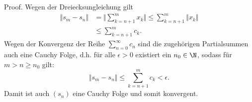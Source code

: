 \documentclass[letterpaper,10pt,english]{jupyterBook}
\begin{document}
\begin{emphBox}{}{}
Proof.  Wegen der Dreiecksungleichung gilt
\begin{align*}
\Vert s_m - s_n \Vert &= \Vert \sum_{k=n+1}^m x_k \Vert  \leq \sum_{k=n+1}^m  \Vert x_k \Vert \\
&\leq \sum_{k=n+1}^m c_k.\end{align*}
Wegen der Konvergenz der Reihe \(\sum_{n=0}^\infty c_n\) sind die zugehörigen Partialsummen auch eine Cauchy Folge, d.h. für alle \(\epsilon > 0\) existiert ein \(n_0 \in \N\), sodass für \(m > n \geq n_0\) gilt:
\begin{equation*}
 \Vert s_m - s_n \Vert \leq \sum_{k=n+1}^m c_k < \epsilon.
\end{equation*}
Damit ist auch \((s_n)\) eine Cauchy Folge und somit konvergent.
\end{emphBox}
\end{document}
